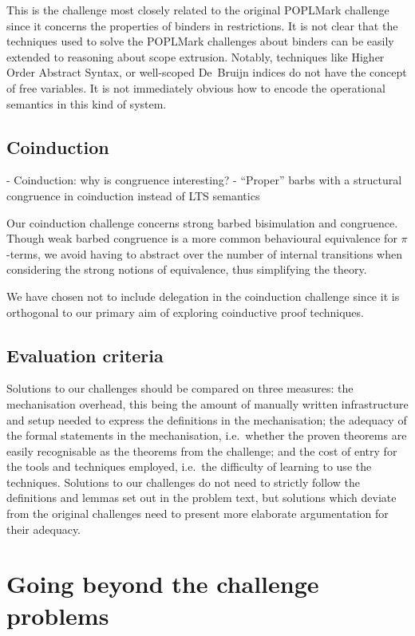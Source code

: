 \documentclass[runningheads]{llncs}
\begin{document}
This is the challenge most closely related to the original POPLMark
challenge since it concerns the properties of binders in restrictions.
It is not clear that the techniques used to solve the POPLMark challenges about binders can be easily extended to reasoning about scope extrusion.
Notably, techniques like Higher Order Abstract Syntax, or well-scoped
De\ Bruijn indices do not have the concept of free variables. It is
not immediately obvious how to encode the operational semantics in
this kind of system.


\subsection{Coinduction}
- Coinduction: why is congruence interesting?
- ``Proper'' barbs with a structural congruence in coinduction instead of LTS semantics

Our coinduction challenge concerns strong barbed bisimulation and congruence.
Though weak barbed congruence is a more common behavioural equivalence for \(\pi\)-terms, we avoid having to abstract over the number of internal transitions when considering the strong notions of equivalence, thus simplifying the theory.

We have chosen not to include delegation in the coinduction challenge since it is orthogonal to our primary aim of exploring coinductive proof techniques.

\subsection{Evaluation criteria}
Solutions to our challenges should be compared on three measures: the mechanisation overhead, this being the amount of manually written infrastructure and setup needed to express the definitions in the mechanisation; the adequacy of the formal statements in the mechanisation, i.e.\ whether the proven theorems are easily recognisable as the theorems from the challenge; and the cost of entry for the tools and techniques employed, i.e.\ the difficulty of learning to use the techniques.
Solutions to our challenges do not need to strictly follow the definitions and lemmas set out in the problem text, but solutions which deviate from the original challenges need to present more elaborate argumentation for their adequacy.


\section{Going beyond the challenge problems}\label{sec:going-beyond}
\end{document}
